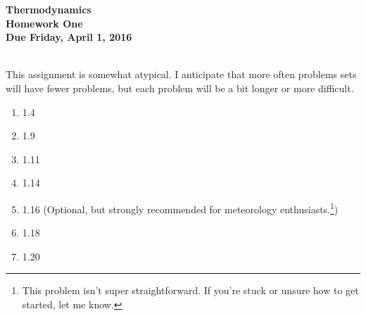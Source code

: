 \documentclass[12pt]{article}
\begin{document}
\pagestyle{empty}
 
\begin{center}
{\large {\bf Thermodynamics}}\\
\medskip
{\large {\bf Homework One}}\\
\medskip
{ {\bf Due Friday, April 1, 2016}}\\
\end{center}

\hspace{2mm}\\

\indent This assignment is somewhat atypical.  I anticipate that more
often problems sets will have fewer problems, but each problem will be
a bit longer or more difficult.  

\begin{enumerate}
\setlength{\itemsep}{-1mm}
  \item 1.4
  \item 1.9 
  \item 1.11
  \item 1.14
  \item 1.16 (Optional, but strongly recommended for meteorology
    enthusiasts.\footnote{This problem isn't super straightforward.  
    If you're stuck or unsure how to get started, let me know.}) 
  \item 1.18
  \item 1.20

\end{enumerate}
\end{document}
